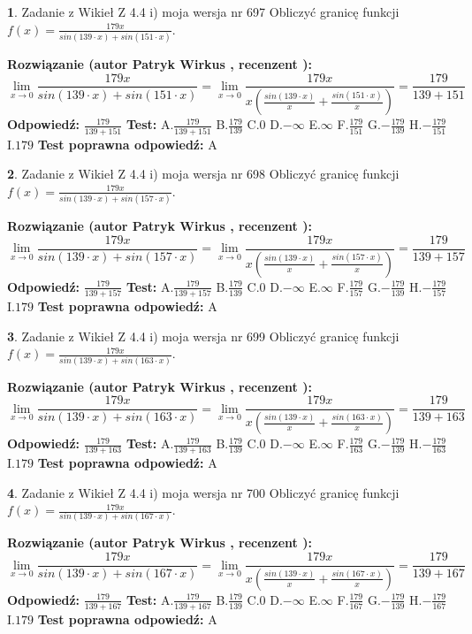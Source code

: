 \documentclass[12pt, a4paper]{article}
\theoremstyle{definition} %
\newtheorem{zad}{}
\newcommand{\zadStart}[1]{\begin{zad}#1\newline}
\newcommand{\zadStop}{\end{zad}}
\newcommand{\rozwStart}[2]{\noindent \textbf{Rozwiązanie (autor #1 , recenzent #2): }\newline}
\newcommand{\rozwStop}{\newline}
\newcommand{\odpStart}{\noindent \textbf{Odpowiedź:}\newline}
\newcommand{\odpStop}{\newline}
\newcommand{\testStart}{\noindent \textbf{Test:}\newline}
\newcommand{\testStop}{\newline}
\newcommand{\kluczStart}{\noindent \textbf{Test poprawna odpowiedź:}\newline}
\newcommand{\kluczStop}{\newline}
\begin{document}
\zadStart{Zadanie z Wikieł Z 4.4 i) moja wersja nr 697}
Obliczyć granicę funkcji $f(x)=\frac{179x}{sin(139\cdot x) +sin(151\cdot x)}$.
\zadStop
\rozwStart{Patryk Wirkus}{}
$$\lim\limits_{x\to 0}\frac{179x}{sin(139\cdot x) +sin(151\cdot x)}=\lim\limits_{x\to 0}\frac{179x}{x(\frac{sin(139\cdot x)}{x}+\frac{sin(151\cdot x)}{x})}=\frac{179}{139+151}$$
\rozwStop
\odpStart
$\frac{179}{139+151}$
\odpStop
\testStart
A.$\frac{179}{139+151}$
B.$\frac{179}{139}$
C.$0$
D.$-\infty$
E.$\infty$
F.$\frac{179}{151}$
G.$-\frac{179}{139}$
H.$-\frac{179}{151}$
I.$179$
\testStop
\kluczStart
A
\kluczStop



\zadStart{Zadanie z Wikieł Z 4.4 i) moja wersja nr 698}
Obliczyć granicę funkcji $f(x)=\frac{179x}{sin(139\cdot x) +sin(157\cdot x)}$.
\zadStop
\rozwStart{Patryk Wirkus}{}
$$\lim\limits_{x\to 0}\frac{179x}{sin(139\cdot x) +sin(157\cdot x)}=\lim\limits_{x\to 0}\frac{179x}{x(\frac{sin(139\cdot x)}{x}+\frac{sin(157\cdot x)}{x})}=\frac{179}{139+157}$$
\rozwStop
\odpStart
$\frac{179}{139+157}$
\odpStop
\testStart
A.$\frac{179}{139+157}$
B.$\frac{179}{139}$
C.$0$
D.$-\infty$
E.$\infty$
F.$\frac{179}{157}$
G.$-\frac{179}{139}$
H.$-\frac{179}{157}$
I.$179$
\testStop
\kluczStart
A
\kluczStop



\zadStart{Zadanie z Wikieł Z 4.4 i) moja wersja nr 699}
Obliczyć granicę funkcji $f(x)=\frac{179x}{sin(139\cdot x) +sin(163\cdot x)}$.
\zadStop
\rozwStart{Patryk Wirkus}{}
$$\lim\limits_{x\to 0}\frac{179x}{sin(139\cdot x) +sin(163\cdot x)}=\lim\limits_{x\to 0}\frac{179x}{x(\frac{sin(139\cdot x)}{x}+\frac{sin(163\cdot x)}{x})}=\frac{179}{139+163}$$
\rozwStop
\odpStart
$\frac{179}{139+163}$
\odpStop
\testStart
A.$\frac{179}{139+163}$
B.$\frac{179}{139}$
C.$0$
D.$-\infty$
E.$\infty$
F.$\frac{179}{163}$
G.$-\frac{179}{139}$
H.$-\frac{179}{163}$
I.$179$
\testStop
\kluczStart
A
\kluczStop



\zadStart{Zadanie z Wikieł Z 4.4 i) moja wersja nr 700}
Obliczyć granicę funkcji $f(x)=\frac{179x}{sin(139\cdot x) +sin(167\cdot x)}$.
\zadStop
\rozwStart{Patryk Wirkus}{}
$$\lim\limits_{x\to 0}\frac{179x}{sin(139\cdot x) +sin(167\cdot x)}=\lim\limits_{x\to 0}\frac{179x}{x(\frac{sin(139\cdot x)}{x}+\frac{sin(167\cdot x)}{x})}=\frac{179}{139+167}$$
\rozwStop
\odpStart
$\frac{179}{139+167}$
\odpStop
\testStart
A.$\frac{179}{139+167}$
B.$\frac{179}{139}$
C.$0$
D.$-\infty$
E.$\infty$
F.$\frac{179}{167}$
G.$-\frac{179}{139}$
H.$-\frac{179}{167}$
I.$179$
\testStop
\kluczStart
A
\kluczStop
\end{document}
